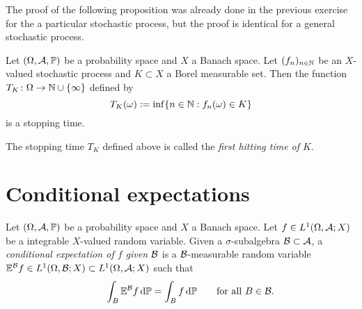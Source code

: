 The proof of the following proposition was already done in the previous exercise for the a particular stochastic process, but the proof is identical for a general stochastic process.

\begin{prop}
  Let $(\Omega, \mathcal{A}, \mathbb{P})$ be a probability space and $X$ a Banach space.
  Let $(f_n)_{n \in \mathbb{N}}$ be an $X$-valued stochastic process and $K \subset X$ a Borel measurable set.
  Then the function $T_K \colon \Omega \rightarrow \mathbb{N} \cup \{\infty\}$ defined by
  \begin{equation*}
    T_K(\omega) := \inf\{n \in \mathbb{N} : f_n(\omega) \in K \}
  \end{equation*}
  is a stopping time.
\end{prop}

The stopping time $T_K$ defined above is called the \emph{first hitting time of $K$}.

\section{Conditional expectations}


\begin{defn}\label{defn:conditional-expectation}
  Let $(\Omega, \mathcal{A}, \mathbb{P})$ be a probability space and $X$ a Banach space.
  Let $f \in L^1(\Omega, \mathcal{A}; X)$ be a integrable $X$-valued random variable.
  Given a $\sigma$-subalgebra $\mathcal{B} \subset \mathcal{A}$, a \emph{conditional expectation of $f$ given $\mathcal{B}$} is a $\mathcal{B}$-measurable random variable $\mathbb{E}^{\mathcal{B}}f \in L^1(\Omega, \mathcal{B}; X) \subset L^1(\Omega,\mathcal{A};X)$ such that
  \begin{equation}\label{eq:conditional-expectation-property}
    \qquad \int_B \mathbb{E}^{\mathcal{B}}f \, \mathrm{d}\mathbb{P} = \int_B f \, \mathrm{d}\mathbb{P} \qquad \text{for all $B \in \mathcal{B}$.}
  \end{equation}
\end{defn}

